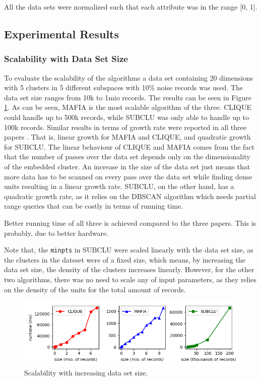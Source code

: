 All the data sets were normalized such that each attribute was in the range [0, 1].

\subsection{Experimental Results}

\subsubsection{Scalability with Data Set Size}
To evaluate the scalability of the algorithms a data set containing 20 dimensions with 5 clusters in 5 different subspaces with 10\% noise records was used. The data set size ranges from 10k to 1mio records. The results can be seen in Figure \ref{fig:dataset_size_vs_runtime}. As can be seen, MAFIA is the most scalable algorithm of the three. CLIQUE could handle up to 500k records, while SUBCLU was only able to handle up to 100k records. Similar results in terms of growth rate were reported in all three papers \cite{mafia,clique,subclu}. That is, linear growth for MAFIA and CLIQUE, and quadratic growth for SUBCLU. The linear behaviour of CLIQUE and MAFIA comes from the fact that the number of passes over the data set depends only on the dimensionality of the embedded cluster. An increase in the size of the data set just means that more data has to be scanned on every pass over the data set while finding dense units resulting in a linear growth rate. SUBCLU, on the other hand, has a quadratic growth rate, as it relies on the DBSCAN algorithm which needs partial range queries that can be costly in terms of running time.

Better running time of all three is achieved compared to the three papers. This is probably, due to better hardware.

Note that, the \texttt{minpts} in SUBCLU were scaled linearly with the data set size, as the clusters in the dateset were of a fixed size, which means, by increasing the data set size, the density of the clusters increases linearly. However, for the other two algorithms, there was no need to scale any of input parameters, as they relies on the density of the units for the total amount of records.
\begin{figure}[H]
    \vspace*{-0.5cm}
    \centering
    \includegraphics[scale=0.45]{figures/dataset_size_vs_runtime.png}
    \caption{Scalability with increasing data set size.}
    \label{fig:dataset_size_vs_runtime}
    \vspace*{-0.5cm}
\end{figure}

